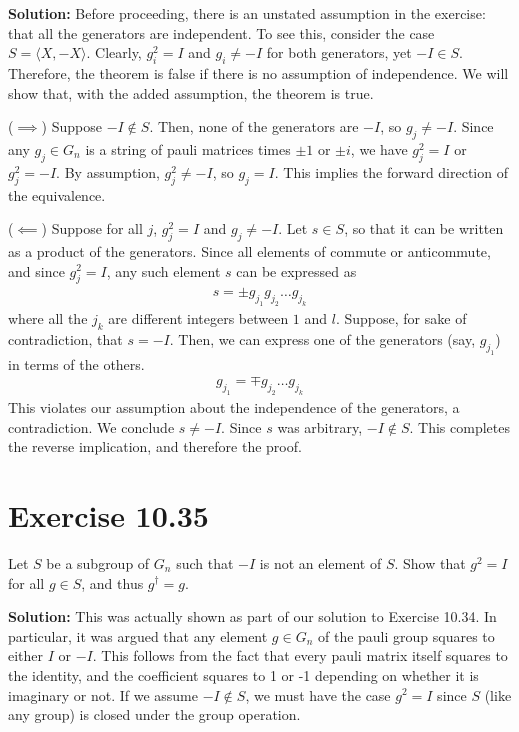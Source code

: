 \documentclass{book}
\begin{document}
    \textbf{Solution:} Before proceeding, there is an unstated assumption in the exercise: that all the generators are independent. To see this, consider the case $S = \langle X, -X \rangle$. Clearly, $g_i^2 = I$ and $g_i \neq -I$ for both generators, yet $-I \in S$. Therefore, the theorem is false if there is no assumption of independence. We will show that, with the added assumption, the theorem is true.
    
    ($\implies$) Suppose $-I \notin S$. Then, none of the generators are $-I$, so $g_j \neq -I$. Since any $g_j \in G_n$ is a string of pauli matrices times $\pm 1$ or $\pm i$, we have $g_j^2 = I$ or $g_j^2 = -I$. By assumption, $g_j^2 \neq -I$, so $g_j = I$. This implies the forward direction of the equivalence.
    
    ($\impliedby$) Suppose for all $j$, $g_j^2 = I$ and $g_j \neq -I$. Let $s \in S$, so that it can be written as a product of the generators. Since all elements of commute or anticommute, and since $g_j^2 = I$, any such element $s$ can be expressed as 
    \begin{align}
        s = \pm g_{j_1}g_{j_2}\dots g_{j_k}
    \end{align}
    where all the $j_k$ are different integers between $1$ and $l$. Suppose, for sake of contradiction, that $s = -I$. Then, we can express one of the generators (say, $g_{j_1}$) in terms of the others.
    \begin{align}
        g_{j_1} = \mp g_{j_2}\dots g_{j_k}
    \end{align}
    This violates our assumption about the independence of the generators, a contradiction. We conclude $s \neq -I$. Since $s$ was arbitrary, $-I \notin S$. This completes the reverse implication, and therefore the proof.
    
\section*{Exercise 10.35}
    Let $S$ be a subgroup of $G_n$ such that $-I$ is not an element of $S$. Show that $g^2 =I$ for all $g\in S$, and thus $g^\dagger = g$.
    
    \textbf{Solution:} This was actually shown as part of our solution to Exercise 10.34. In particular, it was argued that any element $g \in G_n$ of the pauli group squares to either $I$ or $-I$. This follows from the fact that every pauli matrix itself squares to the identity, and the coefficient squares to 1 or -1 depending on whether it is imaginary or not. If we assume $-I\notin S$, we must have the case $g^2 = I$ since $S$ (like any group) is closed under the group operation. 
    
\end{document}
